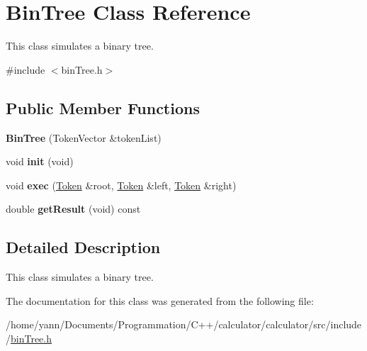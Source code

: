 \hypertarget{class_bin_tree}{\section{Bin\-Tree Class Reference}
\label{class_bin_tree}
}


This class simulates a binary tree.  




{\ttfamily \#include $<$bin\-Tree.\-h$>$}

\subsection*{Public Member Functions}
\begin{DoxyCompactItemize}
\item 
\hypertarget{class_bin_tree_acccd45fd06fa6629d4f0b78246b06f63}{{\bfseries Bin\-Tree} (Token\-Vector \&token\-List)}\label{class_bin_tree_acccd45fd06fa6629d4f0b78246b06f63}

\item 
\hypertarget{class_bin_tree_ac573447f4f0f056b29d36f4b585034d6}{void {\bfseries init} (void)}\label{class_bin_tree_ac573447f4f0f056b29d36f4b585034d6}

\item 
\hypertarget{class_bin_tree_aabd8fc4955f4a2d87ac33ca2fb8d3315}{void {\bfseries exec} (\hyperlink{class_token}{Token} \&root, \hyperlink{class_token}{Token} \&left, \hyperlink{class_token}{Token} \&right)}\label{class_bin_tree_aabd8fc4955f4a2d87ac33ca2fb8d3315}

\item 
\hypertarget{class_bin_tree_a85c7135e307c8f847e3572e4b9612615}{double {\bfseries get\-Result} (void) const }\label{class_bin_tree_a85c7135e307c8f847e3572e4b9612615}

\end{DoxyCompactItemize}


\subsection{Detailed Description}
This class simulates a binary tree. 

The documentation for this class was generated from the following file\-:\begin{DoxyCompactItemize}
\item 
/home/yann/\-Documents/\-Programmation/\-C++/calculator/calculator/src/include/\hyperlink{bin_tree_8h}{bin\-Tree.\-h}\end{DoxyCompactItemize}
